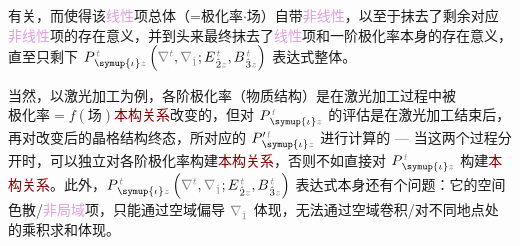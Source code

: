 有关，而使得该\textcolor{Plum}{线性}项总体（=极化率$\cdot$场）自带\textcolor{Plum}{非线性}，以至于抹去了剩余对应\textcolor{Plum}{非线性}项的存在意义，并到头来最终抹去了\textcolor{Plum}{线性}项和一阶极化率本身的存在意义\cite{boydNonlinearOptics2019}，直至只剩下 $P^{\;\!\mathcolor{gray}{t}}_{\;\! \symup{\iota}\mathcolor{gray}{z}} \left( \mathcolor{gray}{\nabla^t}, \mathcolor{gray}{\nabla_{\hat{1}}} ; E^{\;\!\mathcolor{gray}{t}}_{\;\! \hat{2}\mathcolor{gray}{z}}, B^{\;\!\mathcolor{gray}{t}}_{\;\! \hat{3}\mathcolor{gray}{z}} \right)$ 表达式整体。

当然，以激光加工为例，各阶极化率（物质结构）是在激光加工过程中被$\text{极化率} = f(\text{场})$\textcolor{Maroon}{本构关系}改变的，但对 $P^{\;\!\mathcolor{gray}{t}}_{\;\! \symup{\iota}\mathcolor{gray}{z}}$ 的评估是在激光加工结束后，再对改变后的晶格结构终态，所对应的 $P'^{\;\!\mathcolor{gray}{t}}_{\;\! \symup{\iota}\mathcolor{gray}{z}}$ 进行计算的 --- 当这两个过程分开时，可以独立对各阶极化率构建\textcolor{Maroon}{本构关系}，否则不如直接对 $P^{\;\!\mathcolor{gray}{t}}_{\;\! \symup{\iota}\mathcolor{gray}{z}}$ 构建\textcolor{Maroon}{本构关系}。此外，$P^{\;\!\mathcolor{gray}{t}}_{\;\! \symup{\iota}\mathcolor{gray}{z}} \left( \mathcolor{gray}{\nabla^t}, \mathcolor{gray}{\nabla_{\hat{1}}} ; E^{\;\!\mathcolor{gray}{t}}_{\;\! \hat{2}\mathcolor{gray}{z}}, B^{\;\!\mathcolor{gray}{t}}_{\;\! \hat{3}\mathcolor{gray}{z}} \right)$ 表达式本身还有个问题：它的空间\textcolor{NavyBlue}{色散}/\textcolor{Plum}{非局域}项，只能通过空域偏导 $\mathcolor{gray}{\nabla_{\hat{1}}}$ 体现，无法通过空域卷积/对不同地点处的乘积求和体现。

